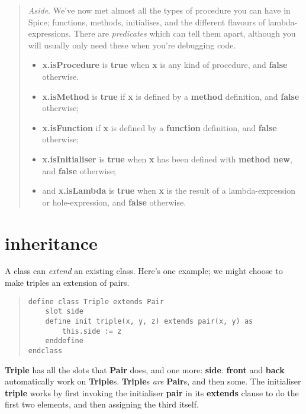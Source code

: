 \documentclass{report}
\begin{document}
\begin{quote}{\em Aside}. We've now met almost all the types of procedure you can have in
Spice; functions, methods, initialises, and the different flavours of
lambda-expressions. There are {\em predicates} which can tell them apart, although
you will usually only need these when you're debugging code.\begin{itemize}\item {\bf x.isProcedure} is {\bf true} when {\bf x} is any kind of procedure, and {\bf false}
otherwise.

\item {\bf x.isMethod} is {\bf true} if {\bf x} is defined by a {\bf method} definition, and {\bf false}
otherwise;

\item {\bf x.isFunction} if {\bf x} is defined by a {\bf function} definition, and {\bf false}
otherwise;

\item {\bf x.isInitialiser} is {\bf true} when {\bf x} has been defined with {\bf method new}, and
{\bf false} otherwise;

\item and {\bf x.isLambda} is {\bf true} when {\bf x} is the result of a lambda-expression or
hole-expression, and {\bf false} otherwise.

\end{itemize}\end{quote}

\section{inheritance}


A class can {\em extend} an existing class. Here's one example; we might
choose to make triples an extension of pairs.

\begin{quote}
\begin{verbatim}
define class Triple extends Pair
    slot side
    define init triple(x, y, z) extends pair(x, y) as
        this.side := z
    enddefine
endclass
\end{verbatim}
\end{quote}


{\bf Triple} has all the slots that {\bf Pair} does, and one more: {\bf side}. {\bf front} and
{\bf back} automatically work on {\bf Triple}s. {\bf Triple}s {\em are} {\bf Pair}s, and then
some. The initialiser {\bf triple} works by first invoking the initialiser {\bf pair}
in its {\bf extends} clause to do the first two elements, and then assigning the
third itself.
\end{document}
